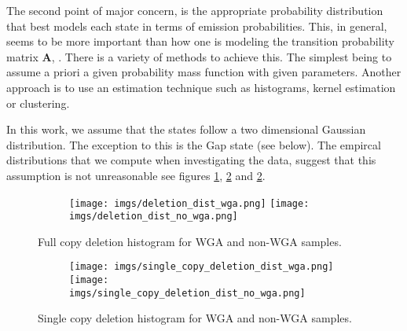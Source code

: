 The second point of major concern, is the appropriate probability distribution that best models each state in terms of emission probabilities. This, in general, seems to be more important than how one is modeling the transition probability matrix $\mathbf{A}$, \cite{rabiner2009}.  There is a variety of methods to achieve this. The simplest being to assume a priori a given probability mass function with given parameters. Another approach is to  use an estimation technique such as histograms, kernel estimation or clustering. 

In this work, we assume that the states follow a two dimensional Gaussian distribution. The exception to this is the Gap state (see below). The empircal distributions that we compute when investigating the data, suggest that this assumption  is not unreasonable see figures \ref{fig:image1}, \ref{fig:image2} and \ref{fig:image2}. 
\begin{figure}[h]
	\begin{subfigure}{}
		\texttt{[image: imgs/deletion\_dist\_wga.png]}
		\texttt{[image: imgs/deletion\_dist\_no\_wga.png]}	
	\end{subfigure}
	
	\caption{Full copy deletion histogram for WGA and non-WGA samples.  }
	\label{fig:image1}
\end{figure}


\begin{figure}[h]
	\begin{subfigure}{}
		\texttt{[image: imgs/single\_copy\_deletion\_dist\_wga.png]}
		\texttt{[image: imgs/single\_copy\_deletion\_dist\_no\_wga.png]}	
	\end{subfigure}
	
	\caption{Single copy deletion histogram for WGA and non-WGA samples.  }
	\label{fig:image2}
\end{figure}


